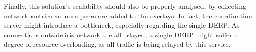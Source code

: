 \documentclass[11pt,twoside,a4paper]{report}
\begin{document}
Finally, this solution's scalability should also be properly analysed, by collecting network metrics as more peers are added to the overlays. In fact, the coordination server might introduce a bottleneck, especially regarding the single \ac{DERP}. As connections outside \ac{iris} network are all relayed, a single \ac{DERP} might suffer a degree of resource overloading, as all traffic is being relayed by this service.

%
%
\cleardoublepage



\cleardoublepage
\end{document}
